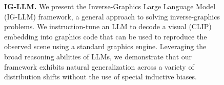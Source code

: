 \begin{figure}
\begin{subfigure}{0.325\textwidth}
\end{subfigure}
\caption{\textbf{IG-LLM.}
We present the Inverse-Graphics Large Language Model (IG-LLM) framework, a general approach to solving inverse-graphics problems.
We instruction-tune an LLM to decode a visual (CLIP) embedding into graphics code that can be used to reproduce the observed scene using a standard graphics engine.
Leveraging the broad reasoning abilities of LLMs, we demonstrate that our framework exhibits natural generalization across a variety of distribution shifts without the use of special inductive biases.
}
\label{fig:teaser}
\vspace{-0.1015cm}
\end{figure}